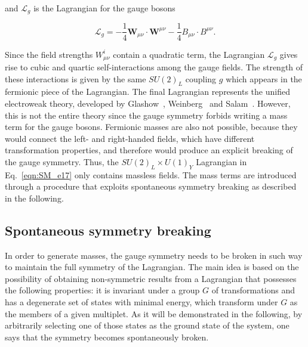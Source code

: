 \noindent and $\mathcal{L}_g$ is the Lagrangian for the gauge bosons

\begin{equation}\label{eqn:SM_e20}
\mathcal{L}_g = -\frac{1}{4}\textbf{W}_{\mu\nu} \cdot \textbf{W}^{\mu\nu} - \frac{1}{4}B_{\mu\nu} \cdot B^{\mu\nu}.
\end{equation}

Since the field strengths $W^i_{\mu\nu}$ contain a quadratic term, the Lagrangian $\mathcal{L}_g$ gives rise to cubic and quartic self-interactions among the gauge fields.
The strength of these interactions is given by the same $SU(2)_L$ coupling $g$ which appears in the fermionic piece of the Lagrangian.
The final Lagrangian represents the unified electroweak theory, developed by Glashow~\cite{GLASHOW1961579}, Weinberg~\cite{PhysRevLett.19.1264} and Salam~\cite{RevModPhys.52.525}.
However, this is not the entire theory since the gauge symmetry forbids writing a mass term for the gauge bosons.
Fermionic masses are also not possible, because they would connect the left- and right-handed fields, which have different transformation properties, and therefore would produce an explicit breaking of the gauge symmetry.
Thus, the $SU(2)_L\times U(1)_Y$ Lagrangian in Eq.~\ref{eqn:SM_e17} only contains massless fields.
The mass terms are introduced through a procedure that exploits spontaneous symmetry breaking as described in the following.

\subsection{Spontaneous symmetry breaking}\label{subsec:EWSB}

In order to generate masses, the gauge symmetry needs to be broken in such way to maintain the full symmetry of the Lagrangian.
The main idea is based on the possibility of obtaining non-symmetric results from a Lagrangian that possesses the following properties:
it is invariant under a group $G$ of transformations and has a degenerate set of states with minimal energy, which transform under $G$ as the members of a given multiplet.
As it will be demonstrated in the following, by arbitrarily selecting one of those states as the ground state of the system, one says that the symmetry becomes spontaneously broken.

